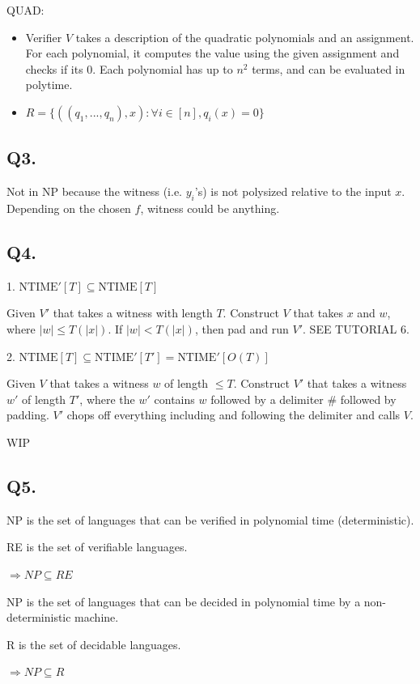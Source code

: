 \documentclass[letterpaper]{article}
\begin{document}
QUAD:
\begin{itemize}
  \item Verifier $V$ takes a description of the quadratic polynomials and an assignment.
        For each polynomial, it computes the value using the given assignment and checks if its 0.
        Each polynomial has up to $n^2$ terms, and can be evaluated in polytime.
  \item $R = \{ ((q_1,...,q_n),x): \forall i \in [n], q_i(x)=0  \}$
\end{itemize}

\subsection*{Q3.}

Not in NP because the witness (i.e. $y_i$'s) is not polysized
relative to the input $x$.
Depending on the chosen $f$, witness could be anything.

\subsection*{Q4.}

1. $\text{NTIME}'[T] \subseteq \text{NTIME}[T]$

Given $V'$ that takes a witness with length $T$.
Construct $V$ that takes $x$ and $w$, where $|w| \le T(|x|)$.
If $|w| < T(|x|)$, then pad and run $V'$.
SEE TUTORIAL 6.

2. $\text{NTIME}[T] \subseteq \text{NTIME}'[T'] = \text{NTIME}'[O(T)]$

Given $V$ that takes a witness $w$ of length $\le T$.
Construct $V'$ that takes a witness $w'$ of length $T'$,
where the $w'$ contains $w$ followed by a delimiter $\#$ followed by padding.
$V'$ chops off everything including and following the delimiter and
calls $V$.

WIP

\subsection*{Q5.}

{\setlength{\parskip}{0pt}
  NP is the set of languages that can be verified in polynomial time (deterministic).

  RE is the set of verifiable languages.

  $\Rightarrow NP \subseteq RE$
}


{\setlength{\parskip}{0pt}
  NP is the set of languages that can be decided in polynomial time by a
  non-deterministic machine.

  R is the set of decidable languages.

  $\Rightarrow NP \subseteq R$
}
\end{document}
